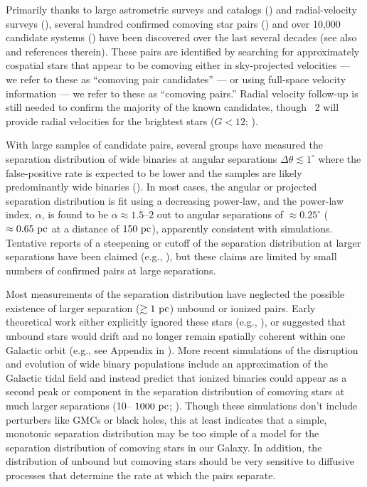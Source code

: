 \documentclass[modern, letterpaper]{aastex61}
\newcommand{\gaia}{\project{Gaia}}
\newcommand{\DR}[1]{\acronym{DR}#1}
\begin{document}
Primarily thanks to large astrometric surveys and catalogs
(\citealt{ESA:1997,Lepine:2005,Gaia-Collaboration:2016}) and radial-velocity
surveys (\citealt{Steinmetz:2006}), several hundred confirmed comoving star
pairs (\citealt{Shaya:2011}) and over 10,000 candidate systems
(\citealt{Gould:2004,Lepine:2007,Tokovinin:2012,Allen:2014,Oh:2017,
Oelkers:2017, Andrews:2017}) have been discovered over the last several decades
(see also \citealt{Chaname:2007} and references therein).
These pairs are identified by searching for approximately cospatial stars that
appear to be comoving either in sky-projected velocities --- we refer to these
as ``comoving pair candidates'' --- or using full-space velocity information ---
we refer to these as ``comoving pairs.''
Radial velocity follow-up is still needed to confirm the majority of the known
candidates, though \gaia\ \DR{2} will provide radial velocities for the
brightest stars ($G < 12$; \citealt{Gaia-Collaboration:2016}).

With large samples of candidate pairs, several groups have measured the
separation distribution of wide binaries at angular separations $\Delta \theta
\lesssim 1^\circ$ where the false-positive rate is expected to be lower
and the samples are likely predominantly wide binaries
(\citealt{Chaname:2004,Lepine:2007,Sesar:2008}).
In most cases, the angular or projected separation distribution is fit using a
decreasing power-law, and the power-law index, $\alpha$, is found to be $\alpha
\approx 1.5$--$2$ out to angular separations of $\approx 0.25^\circ$ ($\approx
0.65~\mathrm{pc}$ at a distance of $150~\mathrm{pc}$), apparently consistent with simulations.
Tentative reports of a steepening or cutoff of the separation distribution at
larger separations have been claimed (e.g., \citealt{Yoo:2004,Quinn:2009}), but
these claims are limited by small numbers of confirmed pairs at large
separations.

Most measurements of the separation distribution have neglected the possible
existence of larger separation ($\gtrsim 1~\mathrm{pc}$) unbound or ionized pairs.
Early theoretical work either explicitly ignored these stars (e.g.,
\citealt{Weinberg:1987}), or suggested that unbound stars would drift and no
longer remain spatially coherent within one Galactic orbit (e.g., see Appendix
in \citealt{Yoo:2004}).
More recent simulations of the disruption and evolution of wide binary
populations include an approximation of the Galactic tidal field and instead
predict that ionized binaries could appear as a second peak or component in the
separation distribution of comoving stars at much larger separations (10--
$1000~\mathrm{pc}$; \citealt{Jiang:2010}).
Though these simulations don't include perturbers like GMCs or black holes,
this at least indicates that a simple, monotonic separation distribution may
be too simple of a model for the separation distribution of comoving stars in
our Galaxy.
In addition, the distribution of unbound but comoving stars should be very
sensitive to diffusive processes that determine the rate at which the pairs
separate.
\end{document}
